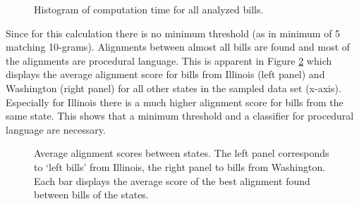 \documentclass[12pt]{article} %
\begin{document}
\begin{figure}[ht!]
\caption{Histogram of computation time for all analyzed bills.}
\label{fig:time} 
\end{figure}

Since for this calculation there is no minimum threshold (as in \citet{wilkerson2015tracing} minimum of 5 matching 10-grams). Alignments between almost all bills are found and most of the alignments are procedural language. This is apparent in Figure \ref{fig:state_to_state} which displays the average alignment score for bills from Illinois (left panel) and Washington (right panel) for all other states in the sampled data set (x-axis). Especially for Illinois there is a much higher alignment score for bills from the same state. This shows that a minimum threshold and a classifier for procedural language are necessary.

\begin{figure}[ht!]
\caption{Average alignment scores between states. The left panel corresponds to `left bills' from Illinois, the right panel to bills from Washington. Each bar displays the average score of the best alignment found between bills of the states.}
\label{fig:state_to_state} 
\end{figure}
\end{document}
